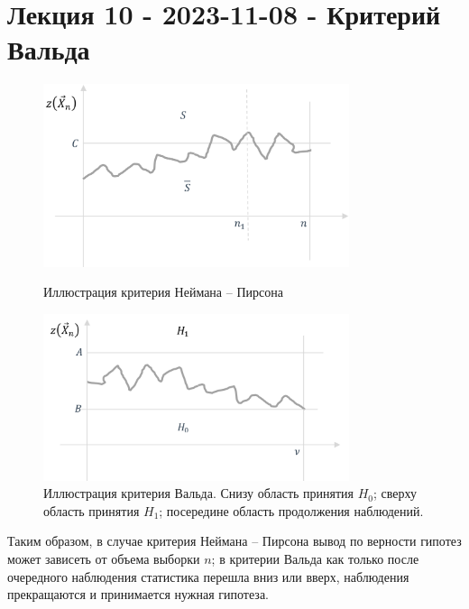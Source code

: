 \section{Лекция 10 - 2023-11-08 - Критерий Вальда}

\begin{figure}[h!]
  \centering
  \begin{minipage}{0.45\textwidth}
    \centering
    \includegraphics[width=0.8\textwidth]{Figures/10-plot1.png}
    \caption{Иллюстрация критерия Неймана -- Пирсона}
    \label{fig:10-plot1}
  \end{minipage}\hfill
  \begin{minipage}{0.45\textwidth}
    \centering
    \includegraphics[width=0.8\textwidth]{Figures/10-plot2.png}
    \caption{Иллюстрация критерия Вальда. Снизу область принятия $H_0$;
      сверху область принятия $H_1$;
    посередине область продолжения наблюдений.}
    \label{fig:10-plot2}
  \end{minipage}
\end{figure}

Таким образом, в случае критерия Неймана -- Пирсона вывод по верности гипотез
может зависеть от объема выборки $ n $; в критерии Вальда как
только после очередного наблюдения статистика перешла вниз или вверх, наблюдения прекращаются и принимается нужная гипотеза.

